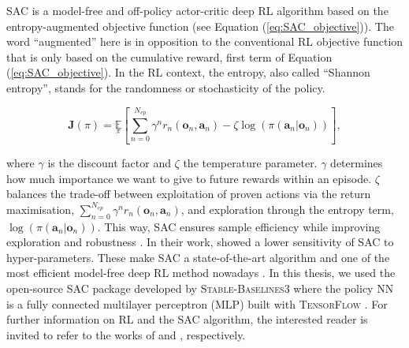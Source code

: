 \gls{SAC} is a model-free and off-policy actor-critic deep \gls{RL} algorithm based on the entropy-augmented objective function (see Equation (\ref{eq:SAC_objective})). The word ``augmented'' here is in opposition to the conventional \gls{RL} objective function that is only based on the cumulative reward, \ie first term of Equation (\ref{eq:SAC_objective}). In the \gls{RL} context, the entropy, also called ``Shannon entropy'', stands for the randomness or stochasticity of the policy.

\begin{equation}
    \label{eq:SAC_objective}
    \bm{J}(\pi) = \underset{\pi}{\mathbb{E}}\left[\underset{n=0}{\overset{N_{ep}}{\sum}}\gamma^n r_n\left(\bm{o}_n,\bm{a}_n \right) - \zeta \log \left(\pi\left(\bm{a}_n | \bm{o}_n\right) \right) \right],
\end{equation}

\noindent
where $\gamma$ is the discount factor and $\zeta$ the temperature parameter. $\gamma$ determines how much importance we want to give to future rewards within an episode. $\zeta$ balances the trade-off between exploitation of proven actions via the return maximisation, \ie $\sum_{n=0}^{N_{ep}}\gamma^n r_n\left(\bm{o}_n,\bm{a}_n \right)$, and exploration through the entropy term, \ie $\log \left(\pi\left(\bm{a}_n | \bm{o}_n\right) \right)$. This way, \gls{SAC} ensures sample efficiency while improving exploration \cite{haarnoja2017reinforcement} and robustness \cite{ziebart2010modeling}. In their work, \citet{haarnoja2017reinforcement} showed a lower sensitivity of \gls{SAC} to hyper-parameters. These make \gls{SAC} a state-of-the-art algorithm and one of the most efficient model-free deep RL method nowadays \cite{haarnoja2017reinforcement}. In this thesis, we used the open-source \gls{SAC} package developed by \textsc{Stable-Baselines3} \cite{raffin2021stable} where the policy \gls{NN} is a fully connected multilayer perceptron (MLP) built with \textsc{TensorFlow} \cite{abadi2016tensorflow}. For further information on \gls{RL} and the \gls{SAC} algorithm, the interested reader is invited to refer to the works of \citet{sutton2018reinforcement} and \citet{haarnoja2018soft}, respectively.

